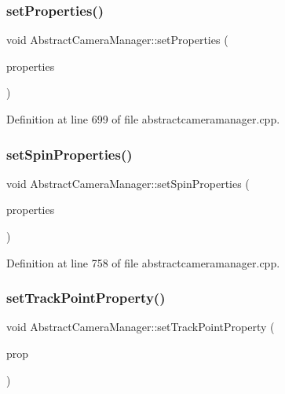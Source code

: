 \subsubsection{\texorpdfstring{setProperties()}{setProperties()}}
{\footnotesize\ttfamily void Abstract\+Camera\+Manager\+::set\+Properties (\begin{DoxyParamCaption}\item[{std\+::vector$<$ \mbox{\hyperlink{class_camera_manager_1_1_camera_property}{Camera\+Manager\+::\+Camera\+Property}} $>$ \&}]{properties }\end{DoxyParamCaption})}



Definition at line 699 of file abstractcameramanager.\+cpp.

\mbox{\label{class_abstract_camera_manager_acc348fb5e89f17e0b80e9e591925d139}} 
\subsubsection{\texorpdfstring{setSpinProperties()}{setSpinProperties()}}
{\footnotesize\ttfamily void Abstract\+Camera\+Manager\+::set\+Spin\+Properties (\begin{DoxyParamCaption}\item[{std\+::vector$<$ \mbox{\hyperlink{class_camera_manager_spin_1_1_spin_camera_property}{Camera\+Manager\+Spin\+::\+Spin\+Camera\+Property}} $>$ \&}]{properties }\end{DoxyParamCaption})}



Definition at line 758 of file abstractcameramanager.\+cpp.

\mbox{\label{class_abstract_camera_manager_a81e28dcc4866f495816a99bcfad9fd21}} 
\subsubsection{\texorpdfstring{setTrackPointProperty()}{setTrackPointProperty()}}
{\footnotesize\ttfamily void Abstract\+Camera\+Manager\+::set\+Track\+Point\+Property (\begin{DoxyParamCaption}\item[{\mbox{\hyperlink{struct_track_point_property}{Track\+Point\+Property}} $\ast$}]{prop }\end{DoxyParamCaption})\hspace{0.3cm}{\ttfamily [inline]}}




